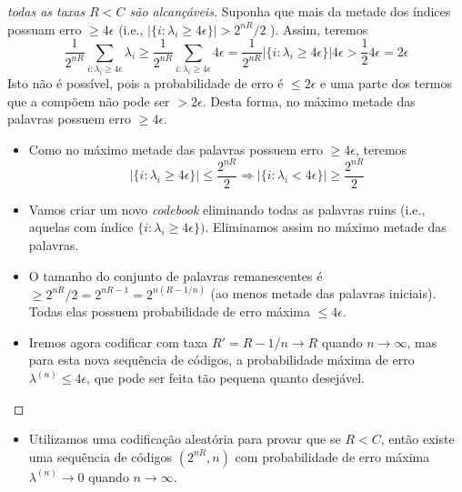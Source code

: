 \begin{frame}[allowframebreaks]
\begin{proof}[todas as taxas $R < C$ são alcançáveis]
  \proofbreak

  Suponha que mais da metade dos índices possuam erro $\geq 4 \epsilon$ 
  (i.e., $\vert \{i: \lambda_i \geq 4 \epsilon \} \vert > 2^{nR}/2$ ). Assim, teremos
  \begin{equation}
  \frac{1}{2^{nR}} \sum_{i: \lambda_i \geq 4\epsilon} \lambda_i \geq \frac{1}{2^{nR}} \sum_{i: \lambda_i \geq 4\epsilon} 4 \epsilon = \frac{1}{2^{nR}} \vert \{i: \lambda_i \geq 4 \epsilon \} \vert 4 \epsilon > \frac{1}{2} 4 \epsilon = 2\epsilon
  \end{equation}
  Isto não é possível, pois a probabilidade de erro é $\leq 2\epsilon$ e uma parte dos termos que a compõem não pode ser $> 2\epsilon$.
  Desta forma, no máximo metade das palavras possuem erro $\geq 4\epsilon$.

  \proofbreak

  \begin{itemize}
  \item Como no máximo metade das palavras possuem erro $\geq 4\epsilon$, teremos
  \begin{equation}
  \vert \{i: \lambda_i \geq 4 \epsilon \} \vert \leq \frac{2^{nR}}{2} \Rightarrow \vert \{i: \lambda_i < 4 \epsilon \} \vert \geq \frac{2^{nR}}{2}
  \end{equation}
  \item Vamos criar um novo \textit{codebook} eliminando todas as palavras ruins 
	(i.e., aquelas com índice $\{i: \lambda_i \geq 4 \epsilon\})$. Eliminamos assim
	no máximo metade das palavras.
  \item O tamanho do conjunto de palavras remanescentes é $\geq 2^{nR}/2 = 2^{nR-1} = 2^{n(R-1/n)}$ 
	(ao menos metade das palavras iniciais). Todas elas possuem probabilidade de erro máxima $\leq 4\epsilon$.
  \end{itemize}

  \proofbreak
  \begin{itemize}
  \item Iremos agora codificar com taxa $R' = R-1/n \rightarrow R$ quando $n \rightarrow \infty$, mas
	para esta nova sequência de códigos, a probabilidade máxima de erro $\lambda^{(n)} \leq 4\epsilon$,
	que pode ser feita tão pequena quanto desejável.
  \end{itemize}
  \end{proof}

  \begin{itemize}
  \item Utilizamos uma codificação aleatória para provar que se $R<C$, então existe uma sequência de códigos $(2^{nR},n)$ 
  com probabilidade de erro máxima $\lambda^{(n)} \rightarrow 0$ quando $n \rightarrow \infty$.


\end{itemize}
\end{frame}
